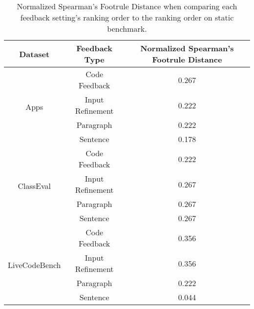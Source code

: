 \begin{table*}
\centering
\begin{tabular}{ccc}
\toprule 
\textbf{Dataset} & \textbf{Feedback Type} & \textbf{Normalized Spearman's Footrule Distance} \\ \hline
\multirow{4}{*}{Apps}  & Code Feedback & 0.267  \\
 & Input Refinement & 0.222  \\
 & Paragraph & 0.222  \\
 & Sentence & 0.178  \\
\hline
\multirow{4}{*}{ClassEval}  & Code Feedback & 0.222 \\
 & Input Refinement & 0.267  \\
 & Paragraph & 0.267  \\
 & Sentence & 0.267  \\
\hline
\multirow{4}{*}{LiveCodeBench} & Code Feedback & 0.356  \\
 & Input Refinement & 0.356  \\
 & Paragraph & 0.222  \\
 & Sentence & 0.044 \\

\bottomrule
\end{tabular}
\caption{Normalized Spearman's Footrule Distance when comparing each feedback setting's ranking order to the ranking order on static benchmark.}
\label{tables:normalized-spearmans-footrule-dist}
\end{table*}


